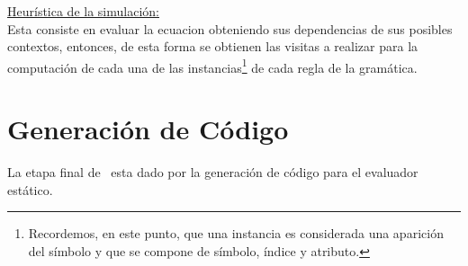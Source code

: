\underline{Heurística de la simulación:}\\


Esta consiste en evaluar la ecuacion obteniendo sus dependencias de sus posibles contextos, entonces, de esta forma se obtienen las visitas a realizar para la computación de cada una de las instancias\footnote{Recordemos, en este punto, que una instancia es considerada una aparición del símbolo y que se compone de símbolo, índice y atributo.} de cada regla de la gramática.

\section{Generación de Código}
La etapa final de \maggen\ esta dado por la generación de código para el evaluador estático. 